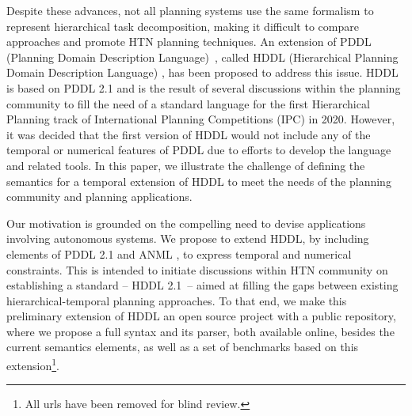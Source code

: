\documentclass[letterpaper]{article} %
\begin{document}
Despite these advances, not all planning systems use the same formalism to represent hierarchical task decomposition, making it difficult to compare approaches and promote HTN planning techniques. %
An extension of PDDL (Planning Domain Description Language)~\citep{mcdermott98}, called HDDL (Hierarchical Planning Domain Description Language) \citep{holler20}, has been proposed to address this issue. HDDL is based on PDDL 2.1 \citep{fox03} and is the result of several discussions within the planning community \citep{Holler19b} to fill the need of a standard language for the first Hierarchical Planning track of International Planning Competitions (IPC) in 2020. However, it was decided that the first version of HDDL would not include any of the temporal or numerical features of PDDL due to efforts to develop the language and related tools. In this paper, we illustrate the challenge of defining the semantics for a temporal extension of HDDL to meet the needs of the planning community and planning applications. %

Our motivation is grounded on the compelling need to devise applications involving autonomous systems. %
We propose to extend HDDL, by including elements of PDDL 2.1 and ANML \citep{smith08}, to express temporal and numerical constraints.
This is intended to initiate discussions within HTN community on establishing a standard -- HDDL 2.1~-- aimed at filling the gaps between existing hierarchical-temporal planning approaches. To that end, we make this preliminary extension of HDDL an open source project with a public repository, where we propose a full syntax and its parser, both available online, besides the current semantics elements, as well as a set of benchmarks based on this extension\footnote{All urls have been removed for blind review.}.
\end{document}
